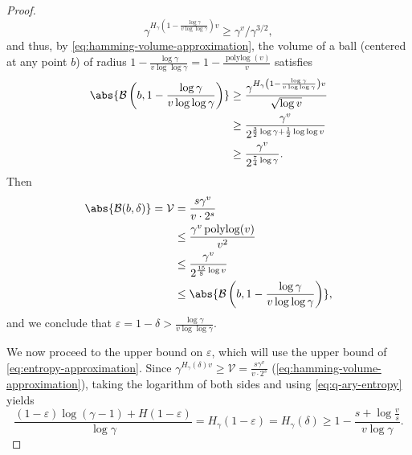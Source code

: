 \documentclass[10pt,a4paper]{article}
\theoremstyle{definition}
\newcommand{\polylog}{\operatorname{polylog}}
\newcommand{\eps}{\varepsilon}
\newcommand{\vcommitlength}{v}
\newcommand{\ball}{\mathcal B}
\newcommand{\alphabetsize}{\gamma}
\begin{document}
\begin{proof}
    \begin{equation*}
        \alphabetsize^{H_\alphabetsize\left(1 - \frac{\log \alphabetsize}{\vcommitlength \log\log \alphabetsize}\right) \vcommitlength} \geq \alphabetsize^\vcommitlength/\alphabetsize^{3/2},
    \end{equation*}
    and thus, by \cref{eq:hamming-volume-approximation}, the volume of a ball (centered at any point $b$) of radius $1 - \frac{\log \alphabetsize}{\vcommitlength \log\log \alphabetsize} = 1 - \frac{\polylog(\vcommitlength)}{\vcommitlength}$ satisfies 
    \begin{align*}
        \abs{\ball\left(b, 1 - \frac{\log \alphabetsize}{\vcommitlength \log\log \alphabetsize}\right)} &\geq \frac{\alphabetsize^{H_\alphabetsize\left(1 - \frac{\log \alphabetsize}{\vcommitlength \log\log \alphabetsize}\right) \vcommitlength}}{\sqrt{\log \vcommitlength}}\\
        &\geq \frac{\alphabetsize^\vcommitlength}{2^{\frac{3}{2}\log \alphabetsize + \frac1 2 \log\log \vcommitlength}}\\
        &\geq \frac{\alphabetsize^\vcommitlength}{2^{\frac{7}{4}\log \alphabetsize}}.
    \end{align*}
    Then
    \begin{align*}
        \abs{\ball(b, \delta)} = \mathcal{V} &= \frac{s \alphabetsize^\vcommitlength}{\vcommitlength \cdot 2^s}\\
        &\leq \frac{\alphabetsize^\vcommitlength \polylog(\vcommitlength)}{\vcommitlength^2}\\
        &\leq \frac{\alphabetsize^\vcommitlength}{2^{\frac{15}{8}\log \vcommitlength}}\\
        &\leq \abs{\ball\left(b, 1 - \frac{\log \alphabetsize}{\vcommitlength \log\log \alphabetsize}\right)},
    \end{align*}
    and we conclude that $\eps = 1 - \delta > \frac{\log \alphabetsize}{\vcommitlength \log\log \alphabetsize}$.

    We now proceed to the upper bound on $\eps$, which will use the upper bound of \cref{eq:entropy-approximation}. Since  $\alphabetsize^{H_\alphabetsize(\delta) \vcommitlength} \geq \mathcal{V} = \frac{s \alphabetsize^\vcommitlength}{\vcommitlength \cdot 2^s}$ (\cref{eq:hamming-volume-approximation}), taking the logarithm of both sides and using \cref{eq:q-ary-entropy} yields
    \begin{equation}
        \label{eq:entropy-volume-inequality}
        \frac{(1 - \eps)\log(\alphabetsize - 1) + H(1 - \eps)}{\log \alphabetsize} = H_\alphabetsize(1 - \eps) = H_\alphabetsize(\delta) \geq 1 - \frac{s + \log \frac{\vcommitlength}{s}}{\vcommitlength \log \alphabetsize}.
    \end{equation}
    

\end{proof}
\end{document}
